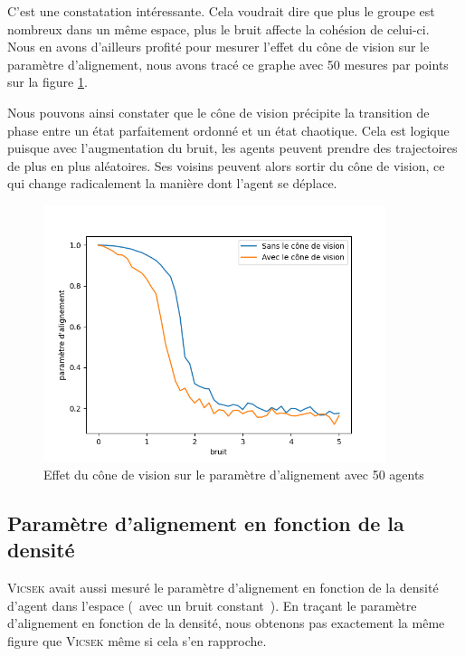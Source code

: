 \documentclass[french, a4paper, 12pt, openany]{report}
\begin{document}
	 C'est une constatation intéressante. Cela voudrait dire que plus le groupe est nombreux dans un même espace, plus le bruit affecte la cohésion de celui-ci. \\
	  
	
	Nous en avons d'ailleurs profité pour mesurer l'effet du cône de vision sur le paramètre d'alignement, nous avons tracé ce graphe avec 50 mesures par points sur la figure \ref{cone_vision_alignement}. 
	
	Nous pouvons ainsi constater que le cône de vision précipite la transition de phase entre un état parfaitement ordonné et un état chaotique. Cela est logique puisque avec l'augmentation du bruit, les agents peuvent prendre des trajectoires de plus en plus aléatoires. Ses voisins peuvent alors sortir du cône de vision, ce qui change radicalement la manière dont l'agent se déplace.
	 \begin{figure}[!h]
		\centering
		\includegraphics[width=10cm]{images/bruit_comparaison[50 mesures par pts].png}
		\caption{Effet du cône de vision sur le paramètre d'alignement avec 50 agents}
		\label{cone_vision_alignement}
	\end{figure}
    \newpage
    \subsection{Paramètre d'alignement en fonction de la densité}

    \textsc{Vicsek} avait aussi mesuré le paramètre d'alignement en fonction de la densité d'agent dans l'espace (~avec un bruit constant~). En traçant le paramètre d'alignement en fonction de la densité, nous obtenons pas exactement la même figure que \textsc{Vicsek} même si cela s'en rapproche.
      
\end{document}
